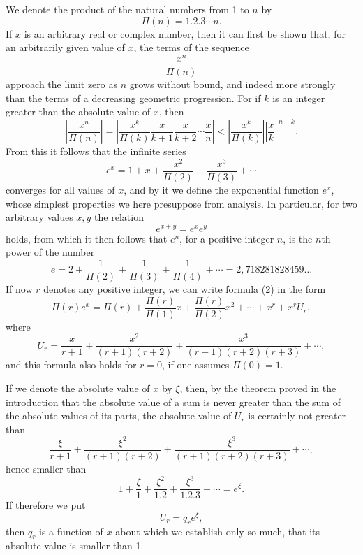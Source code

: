 \documentclass[11pt]{article}
\begin{document}
We denote the product of the natural numbers from 1 to $n$ by
\[
\Pi(n)=1.2.3\cdots n.
\]
If $x$ is an arbitrary real or complex number, then it can first be shown that, for an arbitrarily given value of $x$, the terms of the sequence
\begin{equation}\tag{1}
\frac{x^n}{\Pi(n)}
\end{equation}
approach the limit zero as $n$ grows without bound, and indeed more strongly than the terms of a decreasing geometric progression. For if $k$ is an integer greater than the absolute value of $x$, then
\[
\left|\frac{x^n}{\Pi(n)}\right|
=
\left|\frac{x^k}{\Pi(k)}\frac{x}{k+1}\frac{x}{k+2}\cdots\frac{x}{n}\right|
<
\left|\frac{x^k}{\Pi(k)}\right|\left|\frac{x}{k}\right|^{\,n-k}.
\]
From this it follows that the infinite series
\begin{equation}\tag{2}
e^x=1+x+\frac{x^2}{\Pi(2)}+\frac{x^3}{\Pi(3)}+\cdots
\end{equation}
converges for all values of $x$, and by it we define the exponential function $e^x$, whose simplest properties we here presuppose from analysis. In particular, for two arbitrary values $x,y$ the relation
\[
e^{x+y}=e^x e^y
\]
holds, from which it then follows that $e^n$, for a positive integer $n$, is the $n$th power of the number
\begin{equation}\tag{3}
e=2+\frac1{\Pi(2)}+\frac1{\Pi(3)}+\frac1{\Pi(4)}+\cdots
=2{,}718281828459\ldots
\end{equation}
If now $r$ denotes any positive integer, we can write formula (2) in the form
\begin{equation}\tag{4}
\Pi(r)e^x=\Pi(r)+\frac{\Pi(r)}{\Pi(1)}x+\frac{\Pi(r)}{\Pi(2)}x^2+\cdots+x^r+x^rU_r,
\end{equation}
where
\begin{equation}\tag{5}
U_r=\frac{x}{r+1}+\frac{x^2}{(r+1)(r+2)}+\frac{x^3}{(r+1)(r+2)(r+3)}+\cdots,
\end{equation}
and this formula also holds for $r=0$, if one assumes $\Pi(0)=1$.

If we denote the absolute value of $x$ by $\xi$, then, by the theorem proved in the introduction that the absolute value of a sum is never greater than the sum of the absolute values of its parts, the absolute value of $U_r$ is certainly not greater than
\[
\frac{\xi}{r+1}
+\frac{\xi^2}{(r+1)(r+2)}
+\frac{\xi^3}{(r+1)(r+2)(r+3)}
+\cdots,
\]
hence smaller than
\[
1+\frac{\xi}{1}+\frac{\xi^2}{1.2}+\frac{\xi^3}{1.2.3}+\cdots=e^\xi.
\]
If therefore we put
\[
U_r=q_re^\xi,
\]
then $q_r$ is a function of $x$ about which we establish only so much, that its absolute value is smaller than 1.
\end{document}
